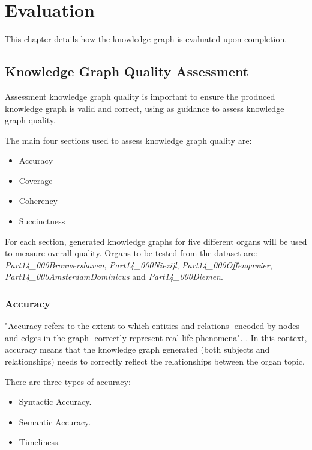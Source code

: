 \chapter{Evaluation}
This chapter details how the knowledge graph is evaluated upon completion. 

\section{Knowledge Graph Quality Assessment}
\hspace{0.5cm} Assessment knowledge graph quality is important to ensure the produced knowledge graph is valid and correct, using \cite{knowledgegraphevaulationbook} as guidance to assess knowledge graph quality.

The main four sections used to assess knowledge graph quality are: 

\begin{itemize}
    \itemsep0em 
    \item Accuracy
    \item Coverage
    \item Coherency
    \item Succinctness
\end{itemize}

For each section, generated knowledge graphs for five different organs will be used to measure overall quality. Organs to be tested from the dataset are: \textit{Part14\_000Brouwershaven}, \textit{Part14\_000Niezijl}, \textit{Part14\_000Offengawier}, \textit{Part14\_000AmsterdamDominicus} and \textit{Part14\_000Diemen}. 

\subsection{Accuracy}
\hspace{0.5cm} "Accuracy refers to the extent to which entities and relations- encoded by nodes and edges in the graph- correctly represent real-life phenomena". \cite{knowledgegraphevaulationbook}. In this context, accuracy means that the knowledge graph generated (both subjects and relationships) needs to correctly reflect the relationships between the organ topic. 

There are three types of accuracy: 
\begin{itemize}
\item Syntactic Accuracy.
\item Semantic Accuracy.
\item Timeliness.
\end{itemize}


